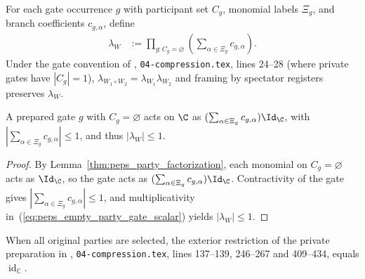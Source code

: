 \begin{definition}
    \label{def:peps_empty_party_gate_scalar}
    \leanok
    For each gate occurrence $g$ with participant set $C_g$, monomial labels
    $\Xi_g$, and branch coefficients $c_{g,\alpha}$, define
    \begin{align}
        \lambda_W & :=\prod_{g:C_g=\varnothing}
        \left(\sum_{\alpha\in\Xi_g}c_{g,\alpha}\right).
        \label{eq:peps_empty_party_gate_scalar}
    \end{align}
    Under the gate convention of
    \cite[Theorem~5.2]{OpenAI2026PolynomialPEPS},
    \texttt{04-compression.tex}, lines 24--28 (where private gates have
    $|C_g|=1$), $\lambda_{W_1\circ W_2}=\lambda_{W_1}\lambda_{W_2}$ and framing
    by spectator registers preserves $\lambda_W$.
\end{definition}

\begin{lemma}
    \label{thm:peps_empty_party_gate_scalar}
    \leanok
    A prepared gate $g$ with $C_g=\varnothing$ acts on $\C$ as
    $(\sum_{\alpha\in\Xi_g}c_{g,\alpha})\Id_{\C}$, with
    $|\sum_{\alpha\in\Xi_g}c_{g,\alpha}|\le1$, and thus $|\lambda_W|\le1$.
\end{lemma}

\begin{proof}\leanok
    By Lemma~\ref{thm:peps_party_factorization}, each monomial on
    $C_g=\varnothing$ acts as $\Id_{\C}$, so the gate acts as
    $(\sum_{\alpha\in\Xi_g}c_{g,\alpha})\Id_{\C}$. Contractivity of the gate
    gives $|\sum_{\alpha\in\Xi_g}c_{g,\alpha}|\le 1$, and multiplicativity
    in~(\ref{eq:peps_empty_party_gate_scalar}) yields $|\lambda_W|\le 1$.
\end{proof}


\begin{lemma}
    \label{thm:peps_actual_private_preparation_exterior}
    \leanok
    When all original parties are selected, the exterior restriction of the
    private preparation in
    \cite[proof of Theorem~5.2]{OpenAI2026PolynomialPEPS},
    \texttt{04-compression.tex}, lines 137--139, 246--267 and 409--434,
    equals $\operatorname{id}_{\mathbb C}$.
\end{lemma}

